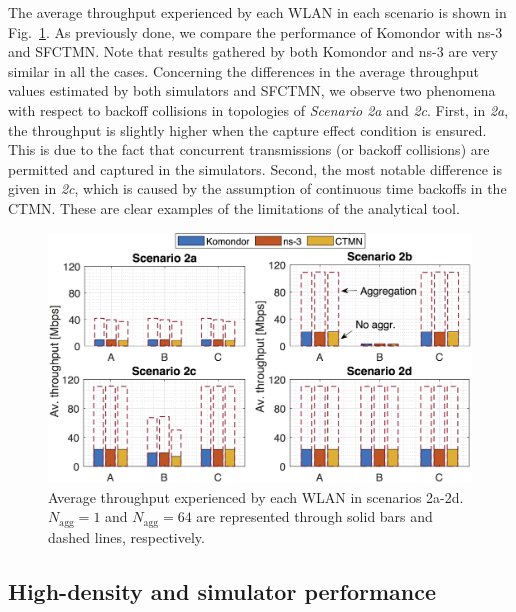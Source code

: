 \documentclass{article}
\begin{document}
	The average throughput experienced by each WLAN in each scenario is shown in Fig.~\ref{fig:results_complex_scenarios}. As previously done, we compare the performance of Komondor with ns-3 and SFCTMN. Note that results gathered by both Komondor and ns-3 are very similar in all the cases. Concerning the differences in the average throughput values estimated by both simulators and SFCTMN, we observe two phenomena with respect to backoff collisions in topologies of \textit{Scenario 2a} and \textit{2c}. First, in \textit{2a}, the throughput is slightly higher when the capture effect condition is ensured. This is due to the fact that concurrent transmissions (or backoff collisions) are permitted and captured in the simulators. Second, the most notable difference is given in \textit{2c}, which is caused by the assumption of continuous time backoffs in the CTMN. These are clear examples of the limitations of the analytical tool.
	
	\begin{figure}[t]
		\centering	
		\includegraphics[width=1\columnwidth]{results_scenario_2.png}
		\caption{Average throughput experienced by each WLAN in scenarios 2a-2d. $N_{\text{agg}} = 1$ and $N_{\text{agg}}=64$ are represented through solid bars and dashed lines, respectively.}
		\label{fig:results_complex_scenarios}
	\end{figure}
	
	\subsection{High-density and simulator performance}
	
\end{document}
